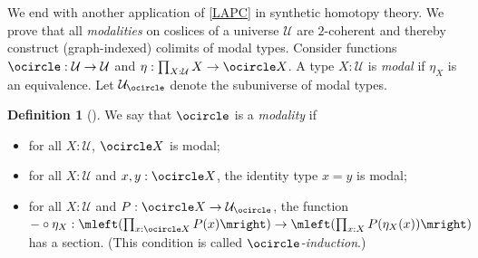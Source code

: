\documentclass[10pt,a4paper]{article}
\theoremstyle{definition}
\newtheorem{defi}[thm]{Definition}
\theoremstyle{remark}
\newcommand{\U}{\mathcal{U}}
\newcommand{\0}{\mathbf{0}}
\newcommand{\1}{\mathbf{1}}
\newcommand{\2}{\mathbf{2}}
\newcommand{\modal}{{\ensuremath{\ocircle}}}
\newcommand{\myhref}[2]{%
  \href{#1}{\textcolor{blue!30!black}{#2}}%
}
\begin{document}
We end with another application of \autoref{LAPC} in synthetic homotopy theory. We prove that all \emph{modalities} on coslices of a universe $\U$ are $2$-coherent and thereby construct (graph-indexed) colimits of modal types. Consider functions $\modal : \U \to \U$ and $\eta : \prod_{X : \U}X \to \modal{X}$. A type $X : \U$ is \emph{modal} if $\eta_X$ is an equivalence. Let $\U_{\modal}$ denote the subuniverse of modal types.
\begin{defi}[{\cite[\myhref{https://github.com/PHart3/colimits-agda/blob/lapc-lmcs/HoTT-Agda/core/lib/types/Modality.agda\#L10}{Modality}]{2cohagda-pub}}]
We say that $\modal$ is a \emph{modality} if 
\begin{itemize}
\item for all $X : \U$, $\modal{X}$ is modal;
\item for all $X : \U$ and $x, y : \modal{X}$, the identity type $x = y$ is modal;
\item for all $X : \U$ and $P : \modal{X} \to \U_{\modal}$, the function ${-} \circ \eta_X : \mleft(\prod_{x : \modal{X}}P(x)\mright) \to \mleft(\prod_{x : X}P(\eta_X(x))\mright)$ has a section. (This condition is called \emph{$\modal$-induction}.)
\end{itemize}
\end{defi} 
 
\end{document}
